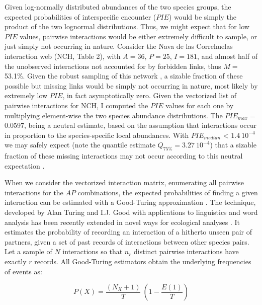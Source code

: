 \documentclass[12pt]{article}
\begin{document}
Given log-normally distributed abundances of the two species groups, the expected probabilities of interspecific encounter ($PIE$) would be simply the product of the two lognormal distributions. Thus, we might expect that for low $PIE$ values, pairwise interactions would be either extremely difficult to sample, or just simply not occurring in nature. Consider the Nava de las Correhuelas interaction web (NCH, Table 2), with $A= 36$, $P= 25$, $I= 181$, and almost half of the unobserved interactions not accounted for by forbidden links, thus $M=$ 53.1\%. Given the robust sampling of this network \citep{Jordano:2009c}, a sizable fraction of these possible but missing links would be simply not occurring in nature, most likely by extremely low $PIE$, in fact asymptotically zero. Given the vectorized list of pairwise interactions for NCH, I computed the $PIE$ values for each one by multiplying element-wise the two species abundance distributions. The ${PIE}_{max}=$ 0.0597, being a neutral estimate, based on the assumption that interactions occur in proportion to the species-specific local abundances. With $PIE_{median}$ < $1.4\ 10^{-4}$ we may safely expect (note the quantile estimate $Q_{75\%}= $$3.27\ 10^{-4}$) that a sizable fraction of these missing interactions may  not occur according to this neutral expectation \citep{E31/2562,Olesen:2011a} \citep[neutral forbidden links, \emph{sensu}][]{Canard:2012jy}.  

When we consider the vectorized interaction matrix, enumerating all pairwise interactions for the $AP$ combinations, the expected probabilities of finding a given interaction can be estimated with a Good-Turing approximation \citep{Good:1953tn}. The technique, developed by Alan Turing and I.J. Good with applications to linguistics and word analysis \citep{Gale:1995uy} has been recently extended in novel ways for ecological analyses \citep{Chao:2015tc}. It estimates the probability of recording an interaction of a hitherto unseen pair of partners, given a set of past records of interactions between other species pairs. Let a sample of $N$ interactions so that $n_r$ distinct pairwise interactions have exactly $r$ records. All Good-Turing estimators obtain the underlying frequencies of events as:

\begin{equation}
P(X)= \frac{(N_X + 1)}{T}\ (1-\frac{E(1)}{T})
\end{equation}
\end{document}
